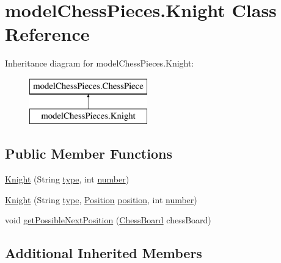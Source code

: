 \hypertarget{classmodel_chess_pieces_1_1_knight}{\section{model\+Chess\+Pieces.\+Knight Class Reference}
\label{classmodel_chess_pieces_1_1_knight}
}
Inheritance diagram for model\+Chess\+Pieces.\+Knight\+:\begin{figure}[H]
\begin{center}
\leavevmode
\includegraphics[height=2.000000cm]{classmodel_chess_pieces_1_1_knight}
\end{center}
\end{figure}
\subsection*{Public Member Functions}
\begin{DoxyCompactItemize}
\item 
\hyperlink{classmodel_chess_pieces_1_1_knight_a147ddcbdf9160932c8b0b386db3954eb}{Knight} (String \hyperlink{classmodel_chess_pieces_1_1_chess_piece_a195487ca88c197af7c1604247be31db2}{type}, int \hyperlink{classmodel_chess_pieces_1_1_chess_piece_a979e63b99128333883acedc38d25dc87}{number})
\item 
\hyperlink{classmodel_chess_pieces_1_1_knight_ac3d5048db997f503429d11d455db2c42}{Knight} (String \hyperlink{classmodel_chess_pieces_1_1_chess_piece_a195487ca88c197af7c1604247be31db2}{type}, \hyperlink{classmodel_core_1_1_position}{Position} \hyperlink{classmodel_chess_pieces_1_1_chess_piece_a3d4362d5b28f6edb14161196d9c6807d}{position}, int \hyperlink{classmodel_chess_pieces_1_1_chess_piece_a979e63b99128333883acedc38d25dc87}{number})
\item 
void \hyperlink{classmodel_chess_pieces_1_1_knight_a0bdd805e2f68c2665ab8d4c5e9aa384d}{get\+Possible\+Next\+Position} (\hyperlink{classmodel_core_1_1_chess_board}{Chess\+Board} chess\+Board)
\end{DoxyCompactItemize}
\subsection*{Additional Inherited Members}


